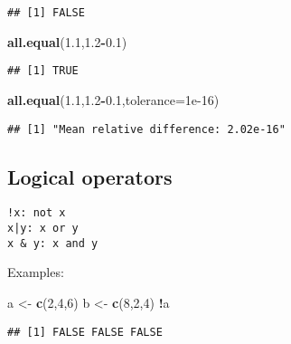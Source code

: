 \documentclass[]{book}
\newenvironment{Shaded}{\begin{snugshade}}{\end{snugshade}}
\newcommand{\KeywordTok}[1]{\textcolor[rgb]{0.13,0.29,0.53}{\textbf{#1}}}
\newcommand{\DataTypeTok}[1]{\textcolor[rgb]{0.13,0.29,0.53}{#1}}
\newcommand{\DecValTok}[1]{\textcolor[rgb]{0.00,0.00,0.81}{#1}}
\newcommand{\FloatTok}[1]{\textcolor[rgb]{0.00,0.00,0.81}{#1}}
\newcommand{\StringTok}[1]{\textcolor[rgb]{0.31,0.60,0.02}{#1}}
\newcommand{\OperatorTok}[1]{\textcolor[rgb]{0.81,0.36,0.00}{\textbf{#1}}}
\newcommand{\NormalTok}[1]{#1}
\theoremstyle{definition}
\theoremstyle{definition}
\theoremstyle{definition}
\theoremstyle{remark}
\begin{document}
\begin{verbatim}
## [1] FALSE
\end{verbatim}

\begin{Shaded}
\begin{Highlighting}[]
\KeywordTok{all.equal}\NormalTok{(}\FloatTok{1.1}\NormalTok{,}\FloatTok{1.2}\OperatorTok{-}\FloatTok{0.1}\NormalTok{)}
\end{Highlighting}
\end{Shaded}

\begin{verbatim}
## [1] TRUE
\end{verbatim}

\begin{Shaded}
\begin{Highlighting}[]
\KeywordTok{all.equal}\NormalTok{(}\FloatTok{1.1}\NormalTok{,}\FloatTok{1.2}\OperatorTok{-}\FloatTok{0.1}\NormalTok{,}\DataTypeTok{tolerance=}\FloatTok{1e-16}\NormalTok{)}
\end{Highlighting}
\end{Shaded}

\begin{verbatim}
## [1] "Mean relative difference: 2.02e-16"
\end{verbatim}

\subsection{Logical operators}\label{logical-operators}

\begin{verbatim}
!x: not x
x|y: x or y
x & y: x and y
\end{verbatim}

Examples:

\begin{Shaded}
\begin{Highlighting}[]
\NormalTok{a <-}\StringTok{ }\KeywordTok{c}\NormalTok{(}\DecValTok{2}\NormalTok{,}\DecValTok{4}\NormalTok{,}\DecValTok{6}\NormalTok{)}
\NormalTok{b <-}\StringTok{ }\KeywordTok{c}\NormalTok{(}\DecValTok{8}\NormalTok{,}\DecValTok{2}\NormalTok{,}\DecValTok{4}\NormalTok{)}
\OperatorTok{!}\NormalTok{a}
\end{Highlighting}
\end{Shaded}

\begin{verbatim}
## [1] FALSE FALSE FALSE
\end{verbatim}
\end{document}
